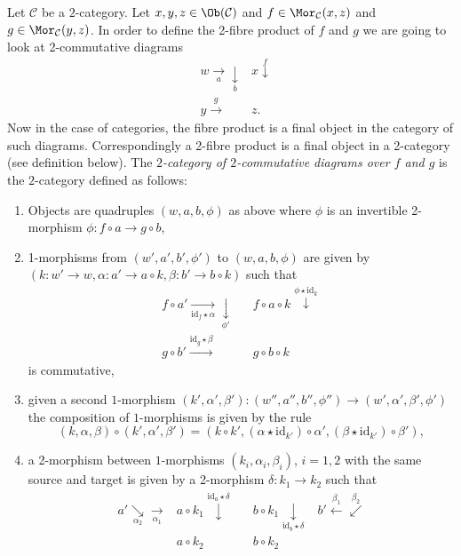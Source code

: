 \medskip\noindent
Let $\mathcal{C}$ be a $2$-category. Let $x, y, z\in \Ob(\mathcal{C})$ and
$f\in \Mor_\mathcal{C}(x, z)$ and $g\in \Mor_{\mathcal C}(y, z)$.
In order to define the 2-fibre product of $f$ and $g$ we are going to look at
2-commutative diagrams
$$
\begin{array}{ccc} & w \underset{a}{\longrightarrow}\underset{b}{\downarrow} & x \overset{f}{\downarrow} \\  & y \overset{g}{\longrightarrow} & z.\end{array}
$$
Now in the case of categories, the fibre product is a final object in the
category of such diagrams. Correspondingly a 2-fibre product is a final object
in a 2-category (see definition below). The {\it $2$-category
of $2$-commutative diagrams over $f$ and $g$}
is the $2$-category defined as follows:
\begin{enumerate}
\item Objects are quadruples $(w, a, b, \phi)$ as above where $\phi$
is an invertible 2-morphism $\phi : f \circ a \to g \circ b$,
\item 1-morphisms from $(w', a', b', \phi')$ to $(w, a, b, \phi)$ are given by
$(k : w' \to w, \alpha : a' \to a \circ k, \beta : b' \to b \circ k)$
such that
$$
\begin{array}{ccc}f \circ a'
\underset{\text{id}_f \star \alpha}{\longrightarrow}\underset{\phi'}{\downarrow} &  & f \circ a \circ k
\overset{\phi \star \text{id}_k}{\downarrow} \\ g \circ b'
\overset{\text{id}_g \star \beta}{\longrightarrow} &  & g \circ b \circ k\end{array}
$$
is commutative,
\item given a second $1$-morphism
$(k', \alpha', \beta') : (w'', a'', b'', \phi'') \to
(w', \alpha', \beta', \phi')$ the composition of $1$-morphisms
is given by the rule
$$
(k, \alpha, \beta) \circ (k', \alpha', \beta') =
(k \circ k',
(\alpha \star \text{id}_{k'}) \circ \alpha',
(\beta \star \text{id}_{k'}) \circ \beta'),
$$
\item a 2-morphism between $1$-morphisms
$(k_i, \alpha_i, \beta_i)$, $i = 1, 2$ with the same source and target
is given by a 2-morphism $\delta : k_1 \to k_2$ such that
$$
\begin{array}{ccccc}a'
\underset{\alpha_2}{\searrow}\underset{\alpha_1}{\longrightarrow} & a \circ k_1
\overset{\text{id}_a \star \delta}{\downarrow} &  & b \circ k_1
\underset{\text{id}_b \star \delta}{\downarrow} & b'
\overset{\beta_1}{\longleftarrow}\overset{\beta_2}{\swarrow} \\  & a \circ k_2 &  & b \circ k_2 & \end{array}
$$
\end{enumerate}
